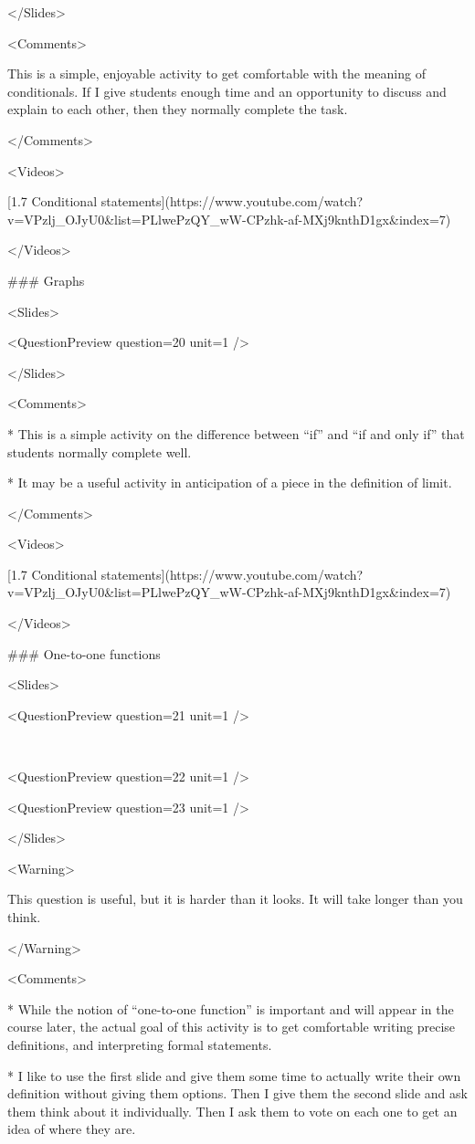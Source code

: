 </Slides>

<Comments>

This is a simple, enjoyable activity to get comfortable with the meaning of conditionals. If I give students enough time and an opportunity to discuss and explain to each other, then they normally complete the task.

</Comments>

<Videos>

[1.7 Conditional statements](https://www.youtube.com/watch?v=VPzlj_OJyU0\&list=PLlwePzQY_wW-CPzhk-af-MXj9knthD1gx\&index=7)

</Videos>

### Graphs

<Slides>

<QuestionPreview question={20} unit={1} />

</Slides>

<Comments>

*   This is a simple activity on the difference between “if” and “if and only if” that students normally complete well.

*   It may be a useful activity in anticipation of a piece in the definition of limit.

</Comments>

<Videos>

[1.7 Conditional statements](https://www.youtube.com/watch?v=VPzlj_OJyU0\&list=PLlwePzQY_wW-CPzhk-af-MXj9knthD1gx\&index=7)

</Videos>

### One-to-one functions

<Slides>

<QuestionPreview question={21} unit={1} />

 

<QuestionPreview question={22} unit={1} />

<QuestionPreview question={23} unit={1} />

</Slides>

<Warning>

This question is useful, but it is harder than it looks. It will take longer than you think.

</Warning>

<Comments>

*   While the notion of “one-to-one function” is important and will appear in the course later, the actual goal of this activity is to get comfortable writing precise definitions, and interpreting formal statements.

*   I like to use the first slide and give them some time to actually write their own definition without giving them options. Then I give them the second slide and ask them think about it individually. Then I ask them to vote on each one to get an idea of where they are.

